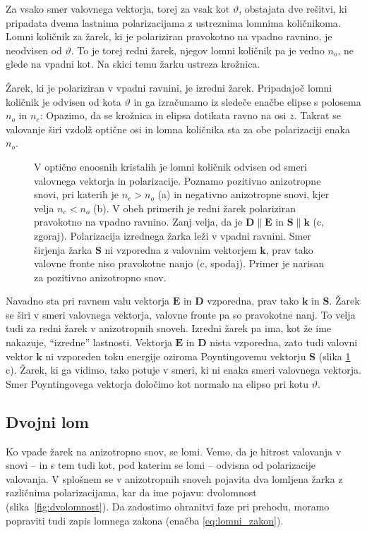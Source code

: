 Za vsako smer valovnega vektorja, torej za vsak kot $\vartheta$, obstajata dve rešitvi, 
ki pripadata dvema lastnima polarizacijama z ustreznima lomnima količnikoma. 
Lomni količnik za žarek, ki je polariziran pravokotno na vpadno ravnino, 
je neodvisen od $\vartheta$. To je torej redni žarek, njegov lomni količnik 
pa je vedno $n_o$, ne glede na vpadni kot. Na skici temu žarku ustreza krožnica.

Žarek, ki je polariziran v vpadni ravnini, je izredni žarek. Pripadajoč
lomni količnik je odvisen od kota $\vartheta$ in 
ga izračunamo iz sledeče enačbe elipse s polosema $n_o$ in $n_e$: 
Opazimo, da se krožnica in elipsa dotikata ravno na osi $z$. Takrat se 
valovanje širi vzdolž optične osi in lomna količnika sta za obe polarizaciji enaka $n_o$. 

\begin{figure}[t]
\centering
\def\svgwidth{140truemm} 

\caption{V optično enoosnih kristalih je lomni količnik odvisen
od smeri valovnega vektorja in polarizacije. Poznamo pozitivno anizotropne snovi, pri katerih
je $n_e>n_o$ (a) in negativno anizotropne snovi, kjer velja $n_e< n_o$ (b). V obeh primerih je redni 
žarek polariziran pravokotno na vpadno ravnino. Zanj velja, 
da je $\mathbf{D} \parallel \mathbf{E}$ in $\mathbf{S} \parallel \mathbf{k}$ (c, zgoraj). Polarizacija 
izrednega žarka leži v vpadni ravnini. Smer širjenja žarka $\mathbf{S}$ ni vzporedna z valovnim vektorjem
$\mathbf{k}$, prav tako valovne fronte niso pravokotne nanjo (c, spodaj). Primer je narisan za pozitivno 
anizotropno snov.}
\label{fig:Elipsa}
\end{figure}

Navadno sta pri ravnem valu vektorja $\mathbf{E}$ in $\mathbf{D}$ vzporedna, 
prav tako $\mathbf{k}$ in $\mathbf{S}$. Žarek se širi v smeri valovnega vektorja, 
valovne fronte pa so pravokotne nanj. To velja tudi za redni žarek v anizotropnih
snoveh. Izredni žarek pa ima, kot že ime nakazuje, ``izredne'' lastnosti. Vektorja
$\mathbf{E}$ in $\mathbf{D}$ nista vzporedna, zato tudi valovni vektor $\mathbf{k}$ ni vzporeden
toku energije oziroma Poyntingovemu vektorju $\mathbf{S}$ (slika \ref{fig:Elipsa}\,c). 
Žarek, ki ga vidimo, tako potuje v smeri, ki ni enaka smeri valovnega vektorja. Smer
Poyntingovega vektorja določimo kot normalo na elipso pri kotu $\vartheta$. 

\subsection*{Dvojni lom}
Ko vpade žarek na anizotropno snov, se lomi. Vemo, da je hitrost valovanja v 
snovi -- in s tem tudi kot, pod katerim se lomi -- odvisna od polarizacije valovanja. V splošnem
se v anizotropnih snoveh pojavita dva lomljena žarka z različnima polarizacijama, kar
da ime pojavu: dvolomnost (slika~\ref{fig:dvolomnost}). Da zadostimo ohranitvi faze
pri prehodu, moramo popraviti tudi zapis lomnega zakona (enačba \ref{eq:lomni_zakon}).

